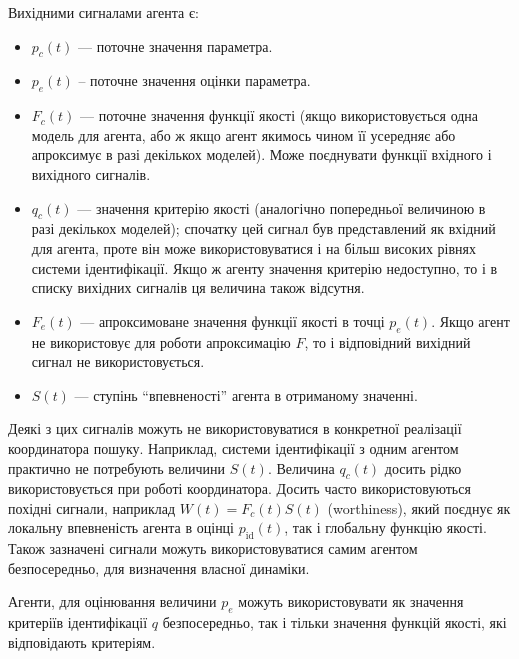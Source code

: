Вихідними сигналами агента є:\label{atu:d:agent_out_list}

\begin{itemize}

  \item
    $p_c(t)$ ---
    поточне значення параметра.

  \item
    $p_e(t)$\label{atu:d:p_e} --
    поточне значення оцінки параметра.

  \item
    $F_c(t)$ ---
    поточне значення функції якості (якщо використовується одна
    модель для агента, або ж якщо агент якимось чином її усередняє
    або апроксимує в разі декількох моделей). Може поєднувати
    функції вхідного і вихідного сигналів.

  \item
    $q_c(t)$ ---
    значення критерію якості (аналогічно попередньої величиною в
    разі декількох моделей); спочатку цей сигнал був представлений
    як вхідний для агента, проте він може використовуватися і
    на більш високих рівнях системи ідентифікації. Якщо ж агенту
    значення критерію недоступно, то і в списку вихідних сигналів
    ця величина також відсутня.

  \item
    $F_e(t)$ ---
    апроксимоване значення функції якості в точці
    $p_e(t)$. Якщо агент не використовує для роботи апроксимацію
    $F$, то і відповідний вихідний сигнал не використовується.

  \item
    $S(t)$ ---
    ступінь ``впевненості'' агента в отриманому значенні.

\end{itemize}

Деякі з цих сигналів можуть не використовуватися в конкретної
реалізації координатора пошуку. Наприклад, системи
ідентифікації з одним агентом практично не потребують величини
$S(t)$. Величина
$q_c(t)$ досить рідко використовується при роботі
координатора. Досить часто використовуються похідні сигнали,
наприклад
$W(t) = F_c(t) S(t)$\label{atu:d:W} (worthiness), який поєднує як локальну впевненість
агента в оцінці
$p_\mathrm{id}(t)$, так і глобальну функцію якості. Також зазначені
сигнали можуть використовуватися самим агентом безпосередньо,
для визначення власної динаміки.


Агенти, для оцінювання величини $p_e$ можуть використовувати як значення
критеріїв ідентифікації $q$ безпосередньо, так і тільки значення функцій
якості, які відповідають критеріям.

